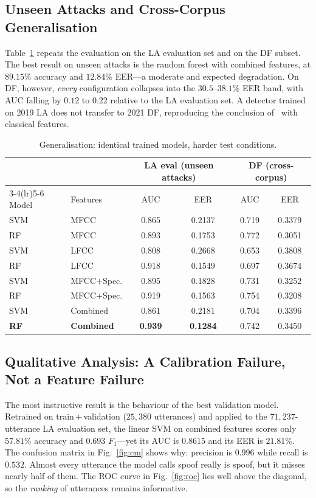 \documentclass[journal,10pt]{IEEEtran}
\begin{document}
\subsection{Unseen Attacks and Cross-Corpus Generalisation}
Table~\ref{tab:gen} repeats the evaluation on the LA evaluation set and on
the DF subset. The best result on unseen attacks is the random forest with
combined features, at $89.15\%$ accuracy and $12.84\%$ EER---a moderate and
expected degradation. On DF, however, \emph{every} configuration collapses
into the $30.5$--$38.1\%$ EER band, with AUC falling by $0.12$ to $0.22$
relative to the LA evaluation set. A detector trained on 2019 LA does not
transfer to 2021 DF, reproducing the conclusion of~\cite{muller2022} with
classical features.

\begin{table}[!t]
\caption{Generalisation: identical trained models, harder test conditions.}
\label{tab:gen}
\centering
\footnotesize
\begin{tabular}{llcccc}
\toprule
& & \multicolumn{2}{c}{LA eval (unseen attacks)}
  & \multicolumn{2}{c}{DF (cross-corpus)} \\
\cmidrule(lr){3-4}\cmidrule(lr){5-6}
Model & Features & AUC & EER & AUC & EER \\
\midrule
SVM & MFCC       & 0.865 & 0.2137 & 0.719 & 0.3379 \\
RF  & MFCC       & 0.893 & 0.1753 & 0.772 & 0.3051 \\
SVM & LFCC       & 0.808 & 0.2668 & 0.653 & 0.3808 \\
RF  & LFCC       & 0.918 & 0.1549 & 0.697 & 0.3674 \\
SVM & MFCC+Spec. & 0.895 & 0.1828 & 0.731 & 0.3252 \\
RF  & MFCC+Spec. & 0.919 & 0.1563 & 0.754 & 0.3208 \\
SVM & Combined   & 0.861 & 0.2181 & 0.704 & 0.3396 \\
\textbf{RF} & \textbf{Combined} & \textbf{0.939} & \textbf{0.1284}
      & 0.742 & 0.3450 \\
\bottomrule
\end{tabular}
\end{table}

\subsection{Qualitative Analysis: A Calibration Failure, Not a Feature Failure}
\label{sec:calib}
The most instructive result is the behaviour of the best validation model.
Retrained on train\,$+$\,validation ($25{,}380$ utterances) and applied to
the $71{,}237$-utterance LA evaluation set, the linear SVM on combined
features scores only $57.81\%$ accuracy and $0.693$ $F_1$---yet its AUC is
$0.8615$ and its EER is $21.81\%$. The confusion matrix in
Fig.~\ref{fig:cm} shows why: precision is $0.996$ while recall is $0.532$.
Almost every utterance the model calls spoof really is spoof, but it misses
nearly half of them. The ROC curve in Fig.~\ref{fig:roc} lies well above the
diagonal, so the \emph{ranking} of utterances remains informative.
\end{document}
